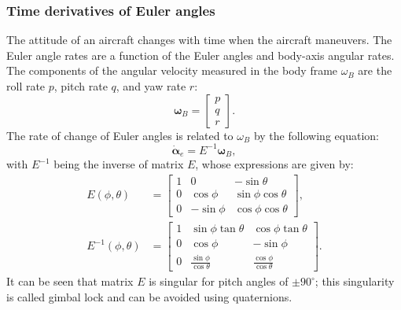 \subsubsection{Time derivatives of Euler angles}
The attitude of an aircraft changes with time when the aircraft maneuvers. The Euler angle rates are a function of the Euler angles and body-axis angular rates. The components of the angular velocity measured in the body frame \(\omega_B\) are the roll rate \(p\), pitch rate \(q\), and yaw rate \(r\):
\begin{equation}
    \boldsymbol{\omega}_B = \begin{bmatrix} 
        p \\ 
        q \\ 
        r 
    \end{bmatrix}. \label{eq:angular_velocity}
\end{equation}
The rate of change of Euler angles is related to \(\omega_B\) by the following equation:
\begin{equation}
    \dot{\boldsymbol{\alpha}}_e = E^{-1} \boldsymbol{\omega}_B, \label{eq:euler_angle_rate}
\end{equation}
with \(E^{-1}\) being the inverse of matrix \(E\), whose expressions are given by:
\begin{align}
    E(\phi, \theta) &= \begin{bmatrix} 
        1 & 0 & -\sin \theta \\ 
        0 & \cos \phi & \sin \phi \cos \theta \\ 
        0 & -\sin \phi & \cos \phi \cos \theta 
    \end{bmatrix}, \label{eq:matrix_E} \\
    E^{-1}(\phi, \theta) &= \begin{bmatrix} 
        1 & \sin \phi \tan \theta & \cos \phi \tan \theta \\ 
        0 & \cos \phi & -\sin \phi \\ 
        0 & \frac{\sin \phi}{\cos \theta} & \frac{\cos \phi}{\cos \theta} 
    \end{bmatrix}. \label{eq:matrix_E_inverse}
\end{align}
It can be seen that matrix \(E\) is singular for pitch angles of \(\pm 90^\circ\); this singularity is called gimbal lock and can be avoided using quaternions.
